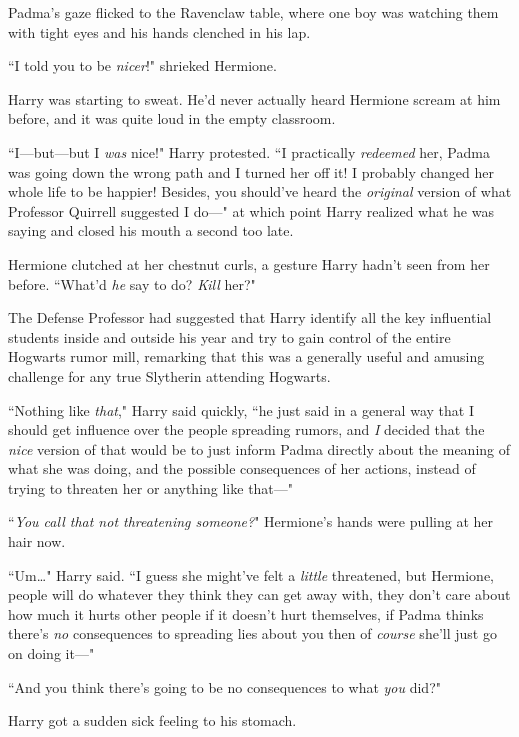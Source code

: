 Padma's gaze flicked to the Ravenclaw table, where one boy was watching them with tight eyes and his hands clenched in his lap.


``I told you to be \emph{nicer}!" shrieked Hermione.

Harry was starting to sweat. He'd never actually heard Hermione scream at him before, and it was quite loud in the empty classroom.

``I—but—but I \emph{was} nice!" Harry protested. ``I practically \emph{redeemed} her, Padma was going down the wrong path and I turned her off it! I probably changed her whole life to be happier! Besides, you should've heard the \emph{original} version of what Professor Quirrell suggested I do—" at which point Harry realized what he was saying and closed his mouth a second too late.

Hermione clutched at her chestnut curls, a gesture Harry hadn't seen from her before. ``What'd \emph{he} say to do? \emph{Kill} her?"

The Defense Professor had suggested that Harry identify all the key influential students inside and outside his year and try to gain control of the entire Hogwarts rumor mill, remarking that this was a generally useful and amusing challenge for any true Slytherin attending Hogwarts.

``Nothing like \emph{that}," Harry said quickly, ``he just said in a general way that I should get influence over the people spreading rumors, and \emph{I} decided that the \emph{nice} version of that would be to just inform Padma directly about the meaning of what she was doing, and the possible consequences of her actions, instead of trying to threaten her or anything like that—"

``\emph{You call that not threatening someone?}" Hermione's hands were pulling at her hair now.

``Um{\ldots}" Harry said. ``I guess she might've felt a \emph{little} threatened, but Hermione, people will do whatever they think they can get away with, they don't care about how much it hurts other people if it doesn't hurt themselves, if Padma thinks there's \emph{no} consequences to spreading lies about you then of \emph{course} she'll just go on doing it—"

``And you think there's going to be no consequences to what \emph{you} did?"

Harry got a sudden sick feeling to his stomach.

